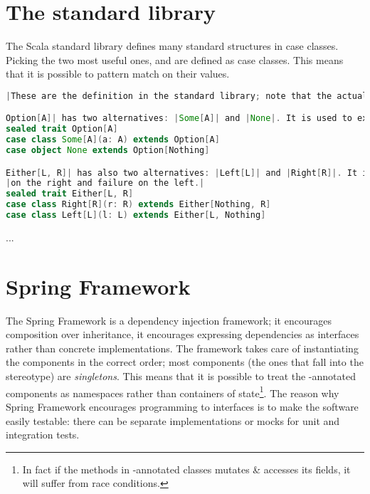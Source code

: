 \documentclass[10 pt]{article}
\begin{document}
\section{The standard library}
The Scala standard library defines many standard structures in case classes. Picking the two most useful ones,  and  are defined as case classes. This means that it is possible to pattern match on their values.

\begin{lstlisting}[caption={Pattern matching in stdlib}, label={code:pm4}, language=Scala, escapechar=|]
|These are the definition in the standard library; note that the actual definitions are more complex, but this code expresses the essence.|

Option[A]| has two alternatives: |Some[A]| and |None|. It is used to express one-or-missing values.|
sealed trait Option[A]
case class Some[A](a: A) extends Option[A]
case object None extends Option[Nothing]

Either[L, R]| has also two alternatives: |Left[L]| and |Right[R]|. It is used to express success or failure, with success by convention|
|on the right and failure on the left.|
sealed trait Either[L, R]
case class Right[R](r: R) extends Either[Nothing, R]
case class Left[L](l: L) extends Either[L, Nothing]
\end{lstlisting}

...


\section{Spring Framework}
The Spring Framework is a dependency injection framework; it encourages composition over inheritance, it encourages expressing dependencies as interfaces rather than concrete implementations. The framework takes care of instantiating the components in the correct order; most components (the ones that fall into the  stereotype) are \emph{singletons}. This means that it is possible to treat the -annotated components as namespaces rather than containers of state\footnote{In fact if the methods in -annotated classes mutates \& accesses its fields, it will suffer from race conditions.}. The reason why Spring Framework encourages programming to interfaces is to make the software easily testable: there can be separate implementations or mocks for unit and integration tests.
\end{document}
